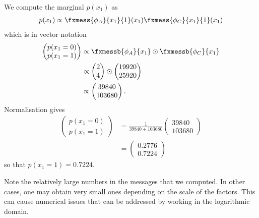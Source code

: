 \begin{exenumerate}
    \begin{solution}
      We compute the marginal $p(x_1)$ as
      \begin{align}
        p(x_1) \propto \fxmess{\phi_A}{x_1}{1}(x_1) \fxmess{\phi_C}{x_1}{1}(x_1)
      \end{align}
      which is in vector notation
      \begin{align}
        \begin{pmatrix}
          p(x_1=0)\\
          p(x_1=1)
        \end{pmatrix}
        & \propto 
        \fxmessb{\phi_A}{x_1} \odot \fxmessb{\phi_C}{x_1}\\
          & \propto  
          \begin{pmatrix}
            2 \\
            4 \\
          \end{pmatrix}
          \odot
          \begin{pmatrix}
            19920\\
            25920
          \end{pmatrix}\\
          & \propto
          \begin{pmatrix}
            39840\\
            103680
          \end{pmatrix}.
      \end{align}
      Normalisation gives
      \begin{align}
        \begin{pmatrix}
          p(x_1=0)\\
          p(x_1=1)
        \end{pmatrix}
     & =  \frac{1}{39840+103680}\begin{pmatrix}
            39840\\
            103680
      \end{pmatrix}\\
     & = \begin{pmatrix}
        0.2776\\
        0.7224
      \end{pmatrix}
      \end{align}
      so that $p(x_1=1) = 0.7224$.

      Note the relatively large numbers in the messages that we
      computed. In other cases, one may obtain very small ones
      depending on the scale of the factors. This can cause
      numerical issues that can be addressed by working in the
      logarithmic domain.
  \end{solution}
  

\end{exenumerate}
